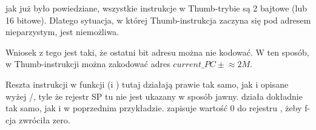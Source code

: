 jak już było powiedziane, wszystkie instrukcje w Thumb-trybie są 2 bajtowe (lub 16 bitowe).
Dlatego sytuacja, w której Thumb-instrukcja zaczyna się pod adresem nieparzystym, jest niemożliwa.

Wniosek z tego jest taki, że ostatni bit adresu można nie kodować.
W ten sposób, w Thumb-instrukcji  można zakodować adres $current\_PC \pm{}\approx{}2M$.

Reszta instrukcji w funkcji (\PUSH i \POP) tutaj działają prawie tak samo, jak i opisane wyżej /, tyle że rejestr \ac{SP} tu nie jest ukazany w sposób jawny.
 działa dokładnie tak samo, jak i w poprzednim przykładzie.
 zapisuje wartość 0 do rejestru , żeby f-cja zwróciła zero.



